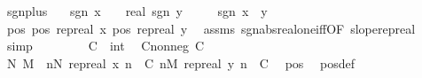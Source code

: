 \begin{isabellebody}
\endisatagproof
{\isafoldproof}%
%
\isadelimproof
%
\endisadelimproof
\isanewline
\isanewline
{}\isamarkupfalse%
\ sgn{\isacharunderscore}{\kern0pt}plus{\isacharcolon}{\kern0pt}\isanewline
\ \ \ {\isachardoublequoteopen}sgn\ x\ {\isacharequal}{\kern0pt}\ {\isacharparenleft}{\kern0pt}{}\ {\isacharcolon}{\kern0pt}{\isacharcolon}{\kern0pt}\ real{\isacharparenright}{\kern0pt}{\isachardoublequoteclose}\ {\isachardoublequoteopen}sgn\ y\ {\isacharequal}{\kern0pt}\ {}{\isachardoublequoteclose}\isanewline
\ \ \ {\isachardoublequoteopen}sgn\ {\isacharparenleft}{\kern0pt}x\ {\isacharplus}{\kern0pt}\ y{\isacharparenright}{\kern0pt}\ {\isacharequal}{\kern0pt}\ {}{\isachardoublequoteclose}\isanewline
%
\isadelimproof
%
\endisadelimproof
%
\isatagproof
{}\isamarkupfalse%
\ {\isacharminus}{\kern0pt}\isanewline
\ \ \isamarkupfalse%
\ pos{\isacharcolon}{\kern0pt}\ {\isachardoublequoteopen}pos\ {\isacharparenleft}{\kern0pt}rep{\isacharunderscore}{\kern0pt}real\ x{\isacharparenright}{\kern0pt}{\isachardoublequoteclose}\ {\isachardoublequoteopen}pos\ {\isacharparenleft}{\kern0pt}rep{\isacharunderscore}{\kern0pt}real\ y{\isacharparenright}{\kern0pt}{\isachardoublequoteclose}\ \isamarkupfalse%
\ assms\ sgn{\isacharunderscore}{\kern0pt}abs{\isacharunderscore}{\kern0pt}real{\isacharunderscore}{\kern0pt}one{\isacharunderscore}{\kern0pt}iff{\isacharbrackleft}{\kern0pt}OF\ slope{\isacharunderscore}{\kern0pt}rep{\isacharunderscore}{\kern0pt}real{\isacharbrackright}{\kern0pt}\ \isamarkupfalse%
\ simp{\isacharplus}{\kern0pt}\isanewline
\ \ \isacommand{{\isacharbraceleft}{\kern0pt}}\isamarkupfalse%
\isanewline
\ \ \ \ \isamarkupfalse%
\ C\ {\isacharcolon}{\kern0pt}{\isacharcolon}{\kern0pt}\ int\ \isamarkupfalse%
\ C{\isacharunderscore}{\kern0pt}nonneg{\isacharcolon}{\kern0pt}\ {\isachardoublequoteopen}C\ {\isasymge}\ {}{\isachardoublequoteclose}\isanewline
\ \ \ \ \isamarkupfalse%
\ \isamarkupfalse%
\ N\ M\ \ {\isachardoublequoteopen}{\isasymforall}n{\isasymge}N{\isachardot}{\kern0pt}\ rep{\isacharunderscore}{\kern0pt}real\ x\ n\ {\isasymge}\ C{\isachardoublequoteclose}\ {\isachardoublequoteopen}{\isasymforall}n{\isasymge}M{\isachardot}{\kern0pt}\ rep{\isacharunderscore}{\kern0pt}real\ y\ n\ {\isasymge}\ C{\isachardoublequoteclose}\ \isamarkupfalse%
\ pos\ \isamarkupfalse%
\ pos{\isacharunderscore}{\kern0pt}def\ \isamarkupfalse%

\end{isabellebody}
